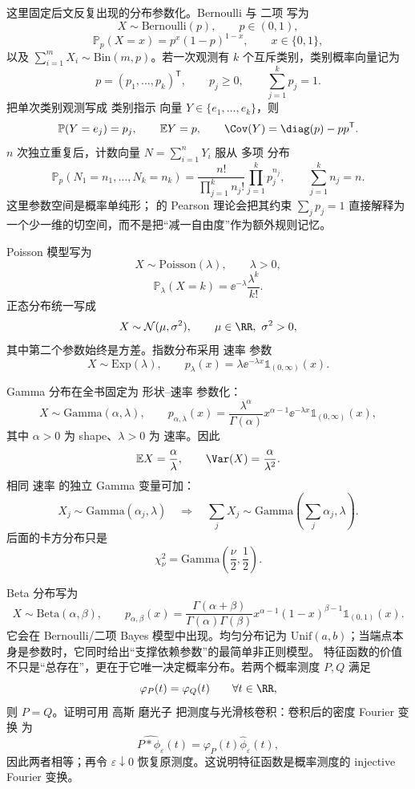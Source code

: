 这里固定后文反复出现的分布参数化。Bernoulli 与 二项 写为
\[
 X\sim\mathrm{Bernoulli}(p),\qquad p\in(0,1),
\]
\[
 \mathbb P_p(X=x)=p^x(1-p)^{1-x},\qquad x\in\{0,1\},
\]
以及 $\sum_{i=1}^mX_i\sim\mathrm{Bin}(m,p)$。若一次观测有 $k$ 个互斥类别，类别概率向量记为
\[
 p=(p_1,\ldots,p_k)^{\mathsf T},
 \qquad
 p_j\ge0,
 \qquad
 \sum_{j=1}^kp_j=1.
\]
把单次类别观测写成 类别指示 向量 $Y\in\{e_1,\ldots,e_k\}$，则
\[
 \mathbb P(Y=e_j)=p_j,
 \qquad
 \mathbb E Y=p,
 \qquad
 \Cov(Y)=\diag(p)-pp^{\mathsf T}.
\]
$n$ 次独立重复后，计数向量 $N=\sum_{i=1}^nY_i$ 服从 多项 分布
\[
 \mathbb P_p(N_1=n_1,\ldots,N_k=n_k)
 =\frac{n!}{\prod_{j=1}^kn_j!}\prod_{j=1}^kp_j^{n_j},
 \qquad
 \sum_{j=1}^kn_j=n.
\]
这里参数空间是概率单纯形； 的 Pearson 理论会把其约束 $\sum_jp_j=1$ 直接解释为一个少一维的切空间，而不是把“减一自由度”作为额外规则记忆。

Poisson 模型写为
\[
 X\sim\mathrm{Poisson}(\lambda),\qquad \lambda>0,
\]
\[
 \mathbb P_\lambda(X=k)=\ee^{-\lambda}\frac{\lambda^k}{k!}.
\]
正态分布统一写成
\[
 X\sim\mathcal N(\mu,\sigma^2),\qquad \mu\in\RR,\ \sigma^2>0,
\]
其中第二个参数始终是方差。指数分布采用 速率 参数
\[
 X\sim\mathrm{Exp}(\lambda),\qquad
 p_\lambda(x)=\lambda\ee^{-\lambda x}\mathds{1}_{(0,\infty)}(x).
\]

Gamma 分布在全书固定为 形状--速率 参数化：
\begin{equation*}X\sim\mathrm{Gamma}(\alpha,\lambda),\qquad
 p_{\alpha,\lambda}(x)
 =\frac{\lambda^\alpha}{\Gamma(\alpha)}
 x^{\alpha-1}\ee^{-\lambda x}\mathds{1}_{(0,\infty)}(x),
\end{equation*}
其中 $\alpha>0$ 为 shape、$\lambda>0$ 为 速率。因此
\[
 \mathbb E X=\frac{\alpha}{\lambda},
 \qquad
 \Var(X)=\frac{\alpha}{\lambda^2}.
\]
相同 速率 的独立 Gamma 变量可加：
\[
 X_j\sim\mathrm{Gamma}(\alpha_j,\lambda)
 \quad\Longrightarrow\quad
 \sum_jX_j\sim\mathrm{Gamma}\!\left(\sum_j\alpha_j,\lambda\right).
\]
后面的卡方分布只是
\[
 \chi^2_\nu=\mathrm{Gamma}\!\left(\frac\nu2,\frac12\right).
\]

Beta 分布写为
\[
 X\sim\mathrm{Beta}(\alpha,\beta),\qquad
 p_{\alpha,\beta}(x)
 =\frac{\Gamma(\alpha+\beta)}{\Gamma(\alpha)\Gamma(\beta)}
 x^{\alpha-1}(1-x)^{\beta-1}\mathds{1}_{(0,1)}(x).
\]
它会在 Bernoulli/二项 Bayes 模型中出现。均匀分布记为 $\mathrm{Unif}(a,b)$；当端点本身是参数时，它同时给出“支撑依赖参数”的最简单非正则模型。
特征函数的价值不只是“总存在”，更在于它唯一决定概率分布。若两个概率测度 $P,Q$ 满足
\[
\varphi_P(t)=\varphi_Q(t)
\qquad\forall t\in\RR,
\]
则 $P=Q$。证明可用 高斯 磨光子 把测度与光滑核卷积：卷积后的密度 Fourier 变换 为
\[
\widehat{P*\phi_\varepsilon}(t)
=\varphi_P(t)\widehat\phi_\varepsilon(t),
\]
因此两者相等；再令 $\varepsilon\downarrow0$ 恢复原测度。这说明特征函数是概率测度的 injective Fourier 变换。

